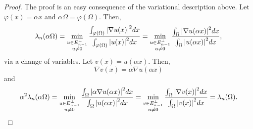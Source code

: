 \begin{proof}
    The proof is an easy consequence of the variational description above. Let \(\varphi(x) = \alpha x\) and \(\alpha \Omega = \varphi(\Omega)\). Then,
    \begin{equation*}
        \lambda_n(\alpha \Omega) = \min_{\substack{u \in E^\perp_{n-1} \\ u \neq 0}}  \frac{\int_{\varphi(\Omega)} \abs{\nabla u(x)}^2 dx}{\int_{\varphi(\Omega)} \abs{u(x)}^2 dx} = \min_{\substack{u \in E^\perp_{n-1} \\ u \neq 0}} \frac{\int_{\Omega} \abs{\nabla u(\alpha x)}^2 dx}{\int_{\Omega} \abs{u(\alpha x)}^2 dx},
    \end{equation*}
    via a change of variables. Let \(v(x) = u(\alpha x)\). Then,
    \[
        \nabla v(x) = \alpha \nabla u (\alpha x)
    \]
    and
    \begin{equation*}
        \alpha^2\lambda_n(\alpha \Omega) = \min_{\substack{u \in E^\perp_{n-1} \\ u \neq 0}} \frac{\int_{\Omega} \abs{\alpha\nabla u(\alpha x)}^2 dx}{\int_{\Omega} \abs{u(\alpha x)}^2 dx} = \min_{\substack{v \in E^\perp_{n-1} \\ u \neq 0}} \frac{\int_{\Omega} \abs{\nabla v(x)}^2 dx}{\int_{\Omega} \abs{v(x)}^2 dx} = \lambda_n(\Omega).
    \end{equation*}
    
\end{proof}



